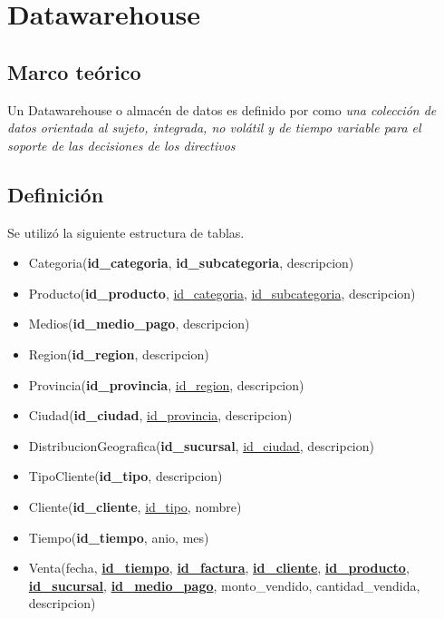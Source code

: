 \section{Datawarehouse}

\subsection{Marco teórico}

Un Datawarehouse o almacén de datos es definido por \autocite{elmasri} como \emph{una colección de datos orientada al sujeto, integrada, no volátil y de tiempo variable para el soporte de las decisiones de los directivos} 

\subsection{Definición}

Se utilizó la siguiente estructura de tablas.

\begin{itemize}
    \item Categoria(\textbf{id\_categoria}, \textbf{id\_subcategoria}, descripcion)
    \item Producto(\textbf{id\_producto}, \underline{id\_categoria}, \underline{id\_subcategoria}, descripcion)
    \item Medios(\textbf{id\_medio\_pago}, descripcion)
    \item Region(\textbf{id\_region}, descripcion)
    \item Provincia(\textbf{id\_provincia}, \underline{id\_region}, descripcion)
    \item Ciudad(\textbf{id\_ciudad}, \underline{id\_provincia}, descripcion)
    \item DistribucionGeografica(\textbf{id\_sucursal}, \underline{id\_ciudad}, descripcion)
    \item TipoCliente(\textbf{id\_tipo}, descripcion)
    \item Cliente(\textbf{id\_cliente}, \underline{id\_tipo}, nombre)
    \item Tiempo(\textbf{id\_tiempo}, anio, mes)
    \item Venta(fecha, \underline{\textbf{id\_tiempo}}, \underline{\textbf{id\_factura}}, \underline{\textbf{id\_cliente}}, \underline{\textbf{id\_producto}}, \underline{\textbf{id\_sucursal}}, \underline{\textbf{id\_medio\_pago}}, monto\_vendido, cantidad\_vendida, descripcion)
\end{itemize}


